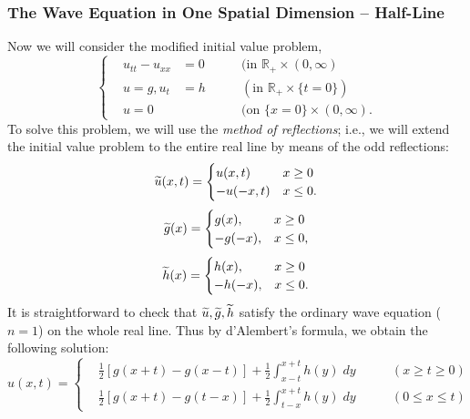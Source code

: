 \documentclass{article}
\numberwithin{equation}{section}
\begin{document}
	\subsubsection{The Wave Equation in One Spatial Dimension -- Half-Line}
	Now we will consider the modified initial value problem, 
	\begin{equation}
		\left\{
		\begin{alignedat}{3}
			&u_{tt} - u_{xx} &=0 &\qquad (\text{in $\mathbb{R}_{+} \times (0, \infty)$} \\
			&u = g, u_{t} &=h &\qquad (\text{in $\mathbb{R}_{+} \times \{t = 0\}$}) \\
			&u = 0 & &\qquad (\text{on $\{x = 0\} \times (0,\infty)$}. 
		\end{alignedat}
		\right.
	\end{equation}
	To solve this problem, we will use the \textit{method of reflections}; i.e., we will extend the initial value problem to the entire real line by means of the odd reflections: 
	\begin{equation*}
		\widetilde{u}(x, t) = 
		\begin{cases}
			u(x, t) & x \geq 0 \\
			-u(-x,t) & x \leq 0.  
		\end{cases}
	\end{equation*}
	\begin{equation*}
		\widetilde{g}(x) = 
		\begin{cases}
			g(x), & x \geq 0 \\
			-g(-x), & x \leq 0,
		\end{cases}
	\end{equation*}
	\begin{equation*}
		\widetilde{h}(x) = 
		\begin{cases}
			h(x), & x \geq 0 \\
			-h(-x), & x \leq 0. 
		\end{cases}
	\end{equation*}
	It is straightforward to check that $\widetilde{u}, \widetilde{g}, \widetilde{h}$ satisfy the ordinary wave equation ($n= 1$) on the whole real line. Thus by d'Alembert's formula, we obtain the following solution: 
	\begin{equation}
		\boxed{u(x, t) = 
			\left\{
			\begin{alignedat}{2}
				&\frac{1}{2}[g(x + t) - g(x-t)] + \frac{1}{2}\int_{x -t}^{x + t}h(y)\;dy &\qquad (x\geq t \geq 0)\\
				&\frac{1}{2}[g(x + t) - g(t - x)] + \frac{1}{2}\int_{t - x}^{x + t}h(y)\;dy &\qquad (0 \leq x \leq t)
			\end{alignedat}
			\right.
		}
	\end{equation}
	
\end{document}
